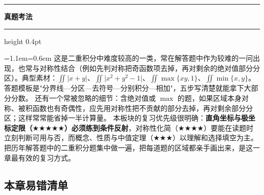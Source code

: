 \documentclass[11pt,openany,UTF8]{ctexbook}
\newcommand{\callouthead}[2]{%
  \par\addvspace{7pt}\noindent
  {\color{#1}\rule[-0.15em]{3pt}{1.05em}}\hspace{0.5em}%
  {\bfseries\color{#1}#2}\par\nobreak\vspace{-0.35em}%
  {\color{rulesep}\hrule height 0.4pt}\nobreak\vspace{0.45em}%
  \begingroup\small\setlength{\parindent}{0pt}%
  \leftskip=1.1em\rightskip=0.6em\noindent\ignorespaces}
\newcommand{\calloutend}{\par\endgroup\addvspace{7pt}}
\newenvironment{callexam}[1]{\callouthead{exambar}{#1}}{\calloutend}
\begin{document}
\begin{callexam}{真题考法}
这是二重积分中难度较高的一类，常在解答题中作为较难的一问出现，也常与对称性结合（例如先判对称把奇函数项去掉，再对剩余的绝对值部分分区）。典型素材：$\iint\vert x+y\vert$、$\iint\vert x^{2}+y^{2}-1\vert$、$\iint\max\{xy,1\}$、$\iint\min\{x,y\}$。答题模板是"分界线—分区—去符号—分别积分—相加"，五步写清楚就能拿下大部分分数。 还有一个常被忽略的细节：含绝对值或 $\max$ 的题，如果区域本身对称、被积函数也有奇偶性，应先用对称性把不贡献的部分去掉，再对剩余部分分区；这样常常能省掉一半计算量。 本板块的复习优先级很明确：\textbf{直角坐标与极坐标定限（$\bigstar$$\bigstar$$\bigstar$$\bigstar$$\bigstar$）必须练到条件反射}，对称性化简（$\bigstar$$\bigstar$$\bigstar$$\bigstar$）要能在读题时立刻判断可用与否，而概念、性质与中值定理（$\bigstar$$\bigstar$$\bigstar$）以理解和选择填空为主。把历年解答题中的二重积分题集中做一遍，把每道题的区域都亲手画出来，是这一章最有效的复习方式。

\end{callexam}

\subsection*{本章易错清单}
\end{document}
